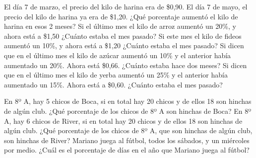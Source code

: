 \documentclass[12pt]{exam}
\begin{document}
\begin{questions}
        \question El día 7 de marzo, el precio del kilo de harina era de \$0,90. El día 7 de mayo, el precio del kilo de harina ya era de \$1,20. ¿Qué porcentaje aumentó el kilo de harina en esos 2 meses?
        \question Si el último mes el kilo de arroz aumentó un 20\%, y ahora está a \$1,50 ¿Cuánto estaba el mes pasado?
        \question Si este mes el kilo de fideos aumentó un 10\%, y ahora está a \$1,20 ¿Cuánto estaba el mes pasado?
        \question Si dicen que en el último mes el kilo de azúcar aumentó un 10\% y el anterior había aumentado un 20\%. Ahora está \$0,66. ¿Cuánto estaba hace dos meses?
        \question Si dicen que en el último mes el kilo de yerba aumentó un 25\% y el anterior había aumentado un 15\%. Ahora está a \$0,60. ¿Cuánto estaba el mes pasado?
        
        \question En 8º A, hay 5 chicos de Boca, si en total hay 20 chicos y de ellos 18 son hinchas de algún club. ¿Qué porcentaje de los chicos de 8º A son hinchas de Boca?
        \question En 8º A, hay 6 chicos de River, si en total hay 20 chicos y de ellos 18 son hinchas de algún club. ¿Qué porcentaje de los chicos de 8º A, que son hinchas de algún club, son hinchas de River?
        \question Mariano juega al fútbol, todos los sábados, y un miércoles por medio. ¿Cuál es el porcentaje de días en el año que Mariano juega al fútbol?
     
    

\end{questions}
\end{document}
